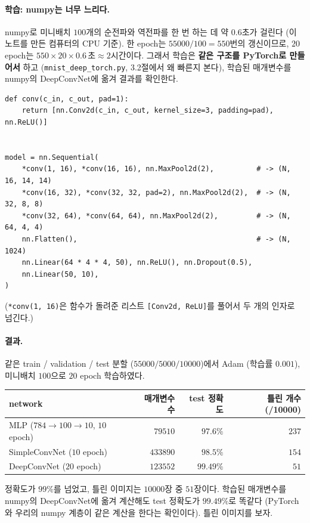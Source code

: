 \documentclass[11pt,a4paper]{article}
\begin{document}
\paragraph{학습: numpy는 너무 느리다.}
numpy로 미니배치 $100$개의 순전파와 역전파를 한 번 하는 데 약 0.6초가 걸린다 (이 노트를 만든 컴퓨터의 CPU 기준).
한 epoch는 $55000/100=550$번의 갱신이므로, $20$ epoch는
$550\times20\times0.6\,\text{초}\approx2$시간이다.
그래서 학습은 \textbf{같은 구조를 PyTorch로 만들어서} 하고 (\texttt{mnist\_deep\_torch.py}, 3.2절에서 왜 빠른지 본다),
학습된 매개변수를 numpy의 DeepConvNet에 옮겨 결과를 확인한다.

\begin{lstlisting}
def conv(c_in, c_out, pad=1):
    return [nn.Conv2d(c_in, c_out, kernel_size=3, padding=pad), nn.ReLU()]


model = nn.Sequential(
    *conv(1, 16), *conv(16, 16), nn.MaxPool2d(2),          # -> (N, 16, 14, 14)
    *conv(16, 32), *conv(32, 32, pad=2), nn.MaxPool2d(2),  # -> (N, 32, 8, 8)
    *conv(32, 64), *conv(64, 64), nn.MaxPool2d(2),         # -> (N, 64, 4, 4)
    nn.Flatten(),                                          # -> (N, 1024)
    nn.Linear(64 * 4 * 4, 50), nn.ReLU(), nn.Dropout(0.5),
    nn.Linear(50, 10),
)
\end{lstlisting}

(\texttt{*conv(1, 16)}은 함수가 돌려준 리스트 \texttt{[Conv2d, ReLU]}를 풀어서 두 개의 인자로 넘긴다.)

\paragraph{결과.}
같은 train / validation / test 분할 ($55000/5000/10000$)에서 Adam (학습률 $0.001$), 미니배치 $100$으로 $20$ epoch 학습하였다.

\begin{center}
{\small
\begin{tabular}{@{}lrrr@{}}
\toprule
network & 매개변수 수 & test 정확도 & 틀린 개수 (/10000) \\
\midrule
MLP ($784\to100\to10$, $10$ epoch) & $79510$ & $97.6\%$ & $237$ \\
SimpleConvNet ($10$ epoch) & $433890$ & $98.5\%$ & $154$ \\
DeepConvNet ($20$ epoch) & $123552$ & $99.49\%$ & $51$ \\
\bottomrule
\end{tabular}}
\end{center}

정확도가 $99\%$를 넘었고, 틀린 이미지는 $10000$장 중 $51$장이다.
학습된 매개변수를 numpy의 DeepConvNet에 옮겨 계산해도 test 정확도가 $99.49\%$로 똑같다
(PyTorch와 우리의 numpy 계층이 같은 계산을 한다는 확인이다). 틀린 이미지를 보자.
\end{document}
